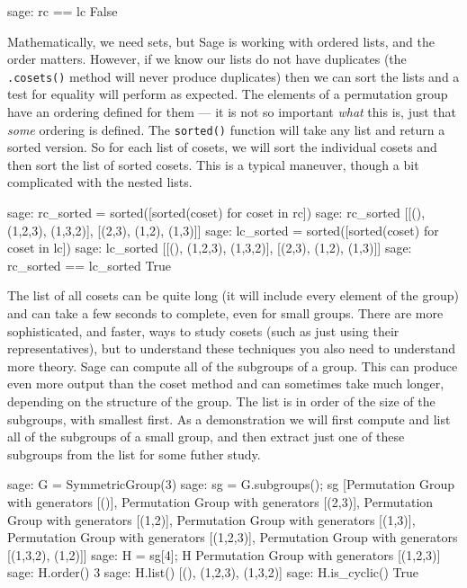 %
\begin{sageexample}
sage: rc == lc
False
\end{sageexample}
%
Mathematically, we need sets, but Sage is working with ordered lists, and the order matters.  However, if we know our lists do not have duplicates (the \verb?.cosets()? method will never produce duplicates) then we can sort the lists and a test for equality will perform as expected.  The elements of a permutation group have an ordering defined for them --- it is not so important \emph{what} this is, just that \emph{some} ordering is defined.  The \verb?sorted()? function will take any list and return a sorted version.  So for each list of cosets, we will sort the individual cosets and then sort the list of sorted cosets.  This is a typical maneuver, though a bit complicated with the nested lists.
%
\begin{sageexample}
sage: rc_sorted = sorted([sorted(coset) for coset in rc])
sage: rc_sorted
[[(), (1,2,3), (1,3,2)], [(2,3), (1,2), (1,3)]]
sage: lc_sorted = sorted([sorted(coset) for coset in lc])
sage: lc_sorted
[[(), (1,2,3), (1,3,2)], [(2,3), (1,2), (1,3)]]
sage: rc_sorted == lc_sorted
True
\end{sageexample}
%
The list of all cosets can be quite long (it will include every element of the group) and can take a few seconds to complete, even for small groups.  There are more sophisticated, and faster, ways to study cosets (such as just using their representatives), but to understand these techniques you also need to understand more theory.
%
%
Sage can compute all of the subgroups of a group.  This can produce even more output than the coset method and can sometimes take much longer, depending on the structure of the group.  The list is in order of the size of the subgroups, with smallest first.  As a demonstration we will first compute and list all of the subgroups of a small group, and then extract just one of these subgroups from the list for some futher study.
%
\begin{sageexample}
sage: G = SymmetricGroup(3)
sage: sg = G.subgroups(); sg
[Permutation Group with generators [()],
 Permutation Group with generators [(2,3)],
 Permutation Group with generators [(1,2)],
 Permutation Group with generators [(1,3)],
 Permutation Group with generators [(1,2,3)],
 Permutation Group with generators [(1,3,2), (1,2)]]
sage: H = sg[4]; H
Permutation Group with generators [(1,2,3)]
sage: H.order()
3
sage: H.list()
[(), (1,2,3), (1,3,2)]
sage: H.is_cyclic()
True
\end{sageexample}
